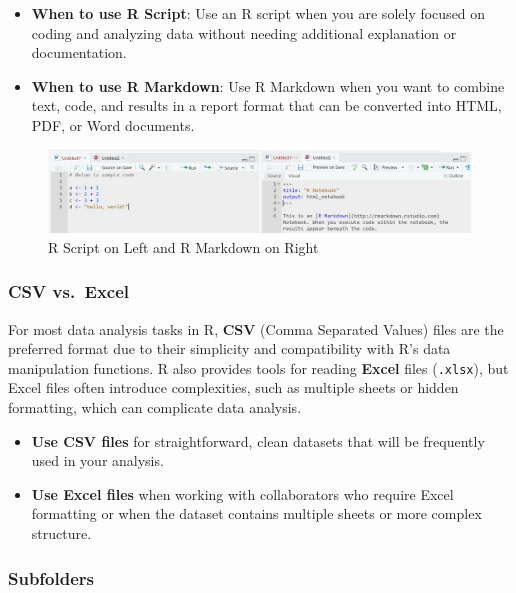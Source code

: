 \documentclass[
]{book}
\providecommand{\tightlist}{%
  \setlength{\itemsep}{0pt}\setlength{\parskip}{0pt}}
\begin{document}
\begin{itemize}
\tightlist
\item
  \textbf{When to use R Script}: Use an R script when you are solely focused on coding and analyzing data without needing additional explanation or documentation.
\item
  \textbf{When to use R Markdown}: Use R Markdown when you want to combine text, code, and results in a report format that can be converted into HTML, PDF, or Word documents.
\end{itemize}

\begin{figure}
\centering
\includegraphics[width=1\textwidth,height=\textheight]{images/script-md.jpg}
\caption{R Script on Left and R Markdown on Right}
\end{figure}

\subsubsection*{CSV vs.~Excel}\label{csv-vs.-excel}

For most data analysis tasks in R, \textbf{CSV} (Comma Separated Values) files are the preferred format due to their simplicity and compatibility with R's data manipulation functions. R also provides tools for reading \textbf{Excel} files (\texttt{.xlsx}), but Excel files often introduce complexities, such as multiple sheets or hidden formatting, which can complicate data analysis.

\begin{itemize}
\tightlist
\item
  \textbf{Use CSV files} for straightforward, clean datasets that will be frequently used in your analysis.
\item
  \textbf{Use Excel files} when working with collaborators who require Excel formatting or when the dataset contains multiple sheets or more complex structure.
\end{itemize}

\subsubsection*{Subfolders}\label{subfolders}
\end{document}
